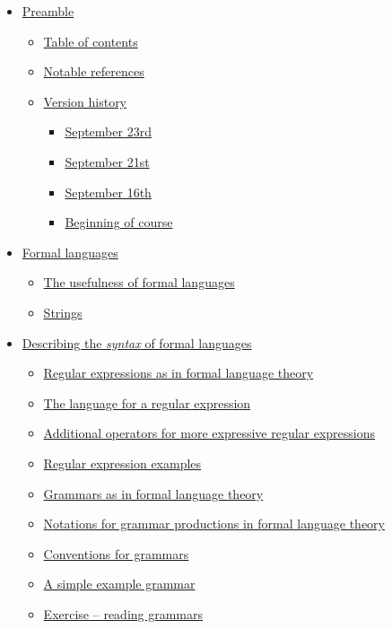\documentclass[11pt]{article}
\theoremstyle{definition}
\begin{document}
\begin{scriptsize}
\begin{itemize}
\item \hyperref[sec:orgb531786]{Preamble}
\begin{itemize}
\item \hyperref[sec:org9fed79f]{Table of contents}
\item \hyperref[sec:orge39b6fa]{Notable references}
\item \hyperref[sec:orgbf1b67c]{Version history}
\begin{itemize}
\item \hyperref[sec:orge322146]{September 23rd}
\item \hyperref[sec:orgc7aa726]{September 21st}
\item \hyperref[sec:org4c813c1]{September 16th}
\item \hyperref[sec:org96611cc]{Beginning of course}
\end{itemize}
\end{itemize}
\item \hyperref[sec:org1abba4f]{Formal languages}
\begin{itemize}
\item \hyperref[sec:orgb78d534]{The usefulness of formal languages}
\item \hyperref[sec:org59c986c]{Strings}
\end{itemize}
\item \hyperref[sec:orgacaeba2]{Describing the \emph{syntax} of formal languages}
\begin{itemize}
\item \hyperref[sec:org459a083]{Regular expressions as in formal language theory}
\item \hyperref[sec:orgc996e04]{The language for a regular expression}
\item \hyperref[sec:orga0426ee]{Additional operators for more expressive regular expressions}
\item \hyperref[sec:org6d3548c]{Regular expression examples}
\item \hyperref[sec:org775a78d]{Grammars as in formal language theory}
\item \hyperref[sec:org8145865]{Notations for grammar productions in formal language theory}
\item \hyperref[sec:org5527a2b]{Conventions for grammars}
\item \hyperref[sec:org40e6ba4]{A simple example grammar}
\item \hyperref[sec:org7e41844]{Exercise – reading grammars}

\end{itemize}
\end{itemize}
\end{scriptsize}
\end{document}
